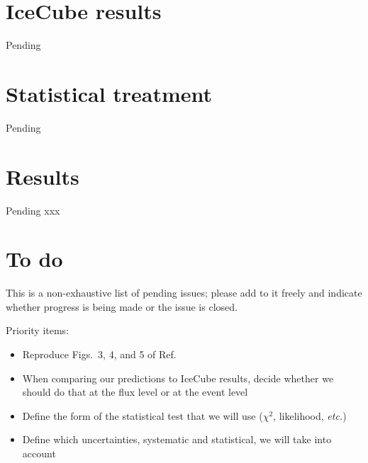 \documentclass[aps,twocolumn,prd,showpacs,showkeys,preprintnumbers,superscriptaddress,nobibnotes,floatfix,longbibliography]{revtex4-1}
\newcommand{\etc}{{\it etc.}}
\newcommand{\Ref}{Ref.}
\begin{document}
\section{IceCube results}

Pending




\section{Statistical treatment}

Pending




\section{Results}

Pending xxx




\section{To do}

This is a non-exhaustive list of pending issues; please add to it freely and indicate whether progress is being made or the issue is closed.
\smallskip

Priority items:
\begin{itemize}
 \item
  Reproduce Figs.\ 3, 4, and 5 of \Ref\ \cite{Ng:2014pca} \\
 \item
  When comparing our predictions to IceCube results, decide whether we should do that at the flux level or at the event level
 \item
  Define the form of the statistical test that we will use ($\chi^2$, likelihood, \etc)
 \item
  Define which uncertainties, systematic and statistical, we will take into account
\end{itemize}
\end{document}
